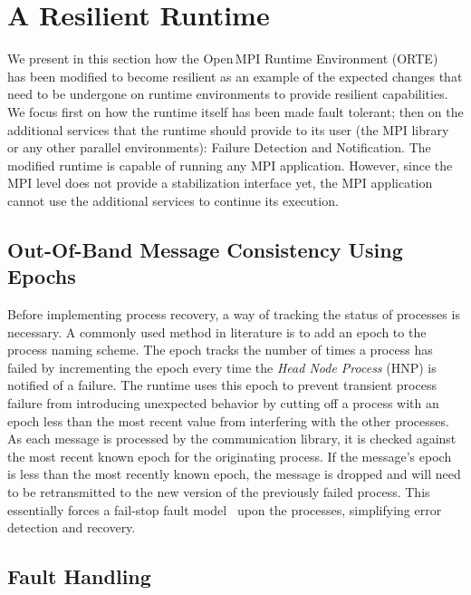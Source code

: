 \documentclass{llncs}
\newcommand{\ompi}{Open\,MPI\xspace}
\begin{document}
\section{A Resilient Runtime}
\label{sect:methodology}

We present in this section how the \ompi Runtime Environment
(ORTE)~\cite{Castain:2008dx} has been modified to become resilient as
an example of the expected changes that need to be undergone on
runtime environments to provide resilient capabilities. We focus first
on how the runtime itself has been made fault tolerant; then on the
additional services that the runtime should provide to its user (the
MPI library or any other parallel environments): Failure Detection and
Notification. The modified runtime is capable of running any MPI
application. However, since the MPI
level does not provide a stabilization interface yet, the MPI
application cannot use the additional services to continue its
execution.

\subsection{Out-Of-Band Message Consistency Using Epochs}
\label{subsect:epochs}
Before implementing process recovery, a way of tracking the status of
processes is necessary. A commonly used method in literature is to add
an epoch to the process naming scheme. The epoch tracks the number of
times a process has failed by incrementing the epoch every time the
{\em Head Node Process} (HNP) is notified of a failure. The runtime
uses this epoch to prevent transient process failure from introducing
unexpected behavior by cutting off a process with an epoch less than
the most recent value from interfering with the other processes. As
each message is processed by the communication library, it is checked
against the most recent known epoch for the originating process. If
the message's epoch is less than the most recently known epoch, the
message is dropped and will need to be retransmitted to the new
version of the previously failed process. This essentially forces a
fail-stop fault model~\cite{FLP85} upon the processes, simplifying error detection
and recovery.
	
\subsection{Fault Handling}
\label{subsect:handling}
\end{document}
